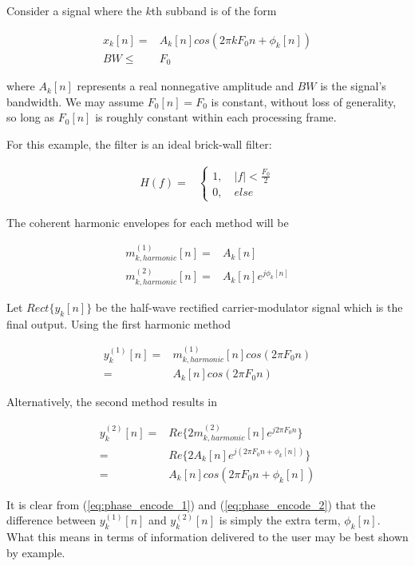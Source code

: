\documentclass [11pt, proquest,oneside] {ganter_thesis}[2015/03/03]
\begin{document}
Consider a signal where the $k$th subband is of the form

\begin{align}
x_k[n] =& A_k[n]cos(2\pi kF_0n + \phi_k[n]) \\
BW \leq& F_0 \nonumber
\end{align}

where $A_k[n]$ represents a real nonnegative amplitude and $BW$ is the signal's bandwidth.  We may assume $F_0[n] = F_0$ is constant, without loss of generality, so long as $F_0[n]$ is roughly constant within each processing frame.

For this example, the filter is an ideal brick-wall filter:

\begin{align}
H(f) =& \left\{
                \begin{array}{ll}
                1, \quad |f| < \frac{F_0}{2} \\
			   0, \quad else \nonumber
                \end{array}
              \right.
\end{align}

The coherent harmonic envelopes for each method will be

\begin{align}
\label{eq:realVSmag1}
m^{(1)}_{k,harmonic}[n] =& A_k[n] \\
m^{(2)}_{k,harmonic}[n] =& A_k[n]e^{j\phi_k[n]}
\end{align}

Let $Rect\{y_k[n]\}$ be the half-wave rectified carrier-modulator signal which is the final output.  Using the first harmonic method

\begin{align}
y_k^{(1)}[n] =& m^{(1)}_{k,harmonic}[n] cos(2\pi F_0 n) \nonumber \\
\label{eq:phase_encode_1}
=& A_k[n] cos(2\pi F_0 n)
\end{align}

Alternatively, the second method results in

\begin{align}
y_k^{(2)}[n] =& Re\{ 2m^{(2)}_{k,harmonic}[n] e^{j2\pi F_0 n} \}  \\ \nonumber
=& Re\{ 2A_k[n]e^{j(2\pi F_0 n + \phi_k[n])} \} \nonumber \\
\label{eq:phase_encode_2}
=& A_k[n]cos(2\pi F_0 n + \phi_k[n])
\end{align}

It is clear from (\ref{eq:phase_encode_1}) and (\ref{eq:phase_encode_2}) that the difference between $y_k^{(1)}[n]$ and $y_k^{(2)}[n]$ is simply the extra term, $\phi_k[n]$.  What this means in terms of information delivered to the user may be best shown by example.
\end{document}
